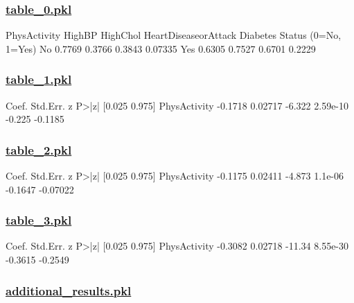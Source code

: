 \documentclass[11pt]{article}
\begin{document}
\subsubsection*{\hyperlink{code-Data Analysis-table-0-pkl}{table\_0.pkl}}

\begin{codeoutput}
                               PhysActivity  HighBP  HighChol  HeartDiseaseorAttack
Diabetes Status (0=No, 1=Yes)                                                      
No                                   0.7769  0.3766    0.3843               0.07335
Yes                                  0.6305  0.7527    0.6701                0.2229
\end{codeoutput}\hypertarget{file-table-1-pkl}{}

\subsubsection*{\hyperlink{code-Data Analysis-table-1-pkl}{table\_1.pkl}}

\begin{codeoutput}
               Coef. Std.Err.      z     P>|z| [0.025  0.975]
PhysActivity -0.1718  0.02717 -6.322  2.59e-10 -0.225 -0.1185
\end{codeoutput}\hypertarget{file-table-2-pkl}{}

\subsubsection*{\hyperlink{code-Data Analysis-table-2-pkl}{table\_2.pkl}}

\begin{codeoutput}
               Coef. Std.Err.      z    P>|z|  [0.025   0.975]
PhysActivity -0.1175  0.02411 -4.873  1.1e-06 -0.1647 -0.07022
\end{codeoutput}\hypertarget{file-table-3-pkl}{}

\subsubsection*{\hyperlink{code-Data Analysis-table-3-pkl}{table\_3.pkl}}

\begin{codeoutput}
               Coef. Std.Err.      z     P>|z|  [0.025  0.975]
PhysActivity -0.3082  0.02718 -11.34  8.55e-30 -0.3615 -0.2549
\end{codeoutput}\hypertarget{file-additional-results-pkl}{}

\subsubsection*{\hyperlink{code-Data Analysis-additional-results-pkl}{additional\_results.pkl}}
\end{document}
